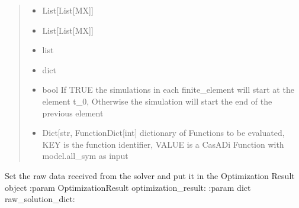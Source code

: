 \documentclass[letterpaper,10pt,english]{sphinxmanual}
\begin{document}
\begin{fulllineitems}
\begin{fulllineitems}
\begin{quote}
\begin{description}
\begin{itemize}
\item {} 
 \textendash{} List{[}List{[}MX{]}{]}

\item {} 
 \textendash{} List{[}List{[}MX{]}{]}

\item {} 
 \textendash{} list

\item {} 
 \textendash{} dict

\item {} 
 \textendash{} bool If TRUE the simulations in each finite\_element will start at the element t\_0,
Otherwise the simulation will start the end of the previous element

\item {} 
 \textendash{} Dict{[}str, Function\textbar{}Dict{[}int{]} dictionary of Functions to be evaluated, KEY is the function
identifier, VALUE is a CasADi Function with model.all\_sym as input

\end{itemize}

\end{description}\end{quote}

\end{fulllineitems}


\begin{fulllineitems}
\label{\detokenize{yaocptool.methods.classic:yaocptool.methods.classic.multipleshooting.MultipleShootingScheme.set_data_to_optimization_result_from_raw_data}}
Set the raw data received from the solver and put it in the Optimization Result object
:param OptimizationResult optimization\_result:
:param dict raw\_solution\_dict:

\end{fulllineitems}



\end{fulllineitems}
\end{document}
